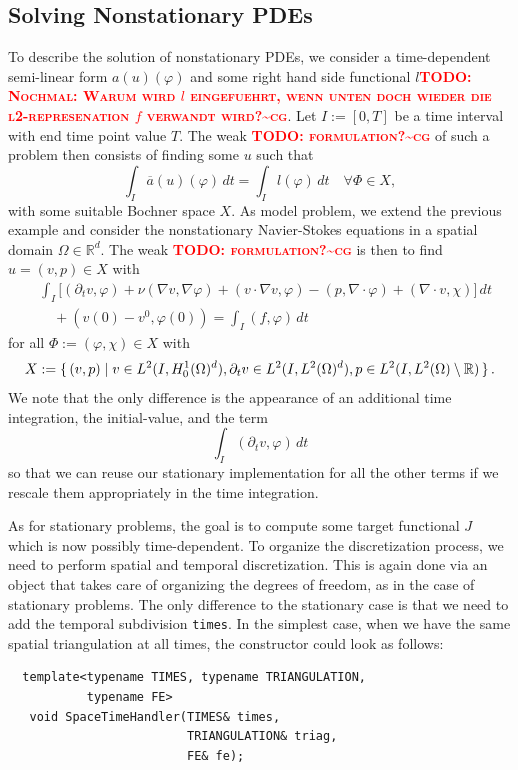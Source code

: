 \documentclass[smallextended]{svjour3}       %
\numberwithin{equation}{section}
\renewcommand{\phi}{\varphi}
\newcommand{\todocg}[1]{\textbf{\textsc{\textcolor{red}{TODO: #1\textasciitilde cg}}}}
\begin{document}
\subsection{Solving Nonstationary PDEs}\label{sec:timedep}
To describe the solution of nonstationary 
PDEs, we consider a time-dependent semi-linear form $a(u)(\phi)$ and some
right hand side functional $l$\todocg{Nochmal: Warum wird $l$ eingefuehrt, wenn unten doch wieder die l2-represenation $f$ verwandt wird?}. Let $I:=[0,T]$ be a time interval with end time point value $T$.
The weak \todocg{formulation?} of such a problem then consists of finding some $u$ such that
\[
\int_I \overline{a}(u)(\phi)\, dt = \int_I l(\phi)\, dt \quad \forall\Phi\in X,
\]
with some suitable Bochner space $X$.  As model problem,
we extend the previous example and consider the nonstationary Navier-Stokes equations
in a spatial domain $\Omega\in\mathbb{R}^d$. The weak \todocg{formulation?} is then to find 
$u = (v,p)\in X$ with
\begin{align*}
&\int_I \bigl[ (\partial_t v, \phi)
+ \nu (\nabla v, \nabla \phi) + (v\cdot\nabla v, \phi)
- (p,\nabla\cdot \phi)
+ (\nabla\cdot v, \chi)\bigr] \, dt\\
&\quad + (v(0) - v^0, \phi(0))
= \int_I (f,\phi) \, dt 
\end{align*}
for all $\Phi:= (\phi, \chi) \in X$ with
\[
X:= \set{ 
(v,p) | v\in L^2(I,H_0^1(\Omega)^d) , 
\partial_t v\in L^2(I, L^2(\Omega)^d), 
p\in L^2(I,L^2(\Omega)\setminus\mathbb{R})}.
\]
We note that the only difference is the appearance of an additional
time integration, the initial-value, and the term 
\[
\int_I (\partial_t v, \phi)\,dt
\]
so that we can reuse our stationary implementation for all the other 
terms if we rescale them appropriately in the time integration.

As for stationary problems, the goal is to compute
some target functional $J$ which is now possibly 
time-dependent. To organize the discretization 
process, we need to perform spatial and temporal 
discretization. This is again done via
an object that takes care of organizing the degrees of 
freedom, as in the case of stationary problems.
The only difference to the stationary case is that we need to 
add the temporal subdivision \texttt{times}. In the simplest 
case, when we have the same spatial triangulation 
at all times, the constructor could look as follows:
\begin{lstlisting}
  template<typename TIMES, typename TRIANGULATION, 
           typename FE>
   void SpaceTimeHandler(TIMES& times,
                         TRIANGULATION& triag,
                         FE& fe);
\end{lstlisting}
\end{document}
